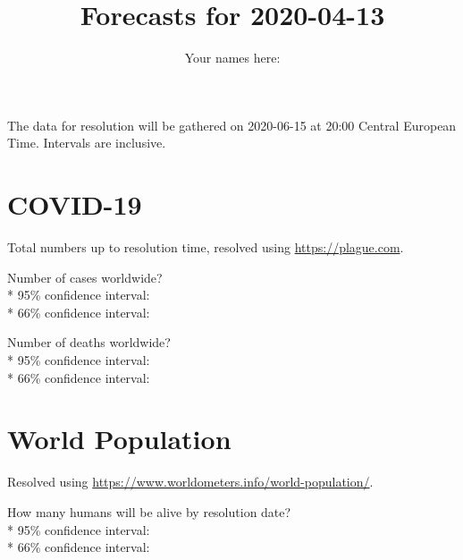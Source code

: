\documentclass{article}
\title{Forecasts for 2020-04-13}
\begin{document}
\date{\vspace{-7ex}}

\author{Your names here: \underline{\hspace{10cm}}}

\maketitle

\vspace{0.5cm}

The data for resolution will be gathered on 2020-06-15 at 20:00 Central
European Time. Intervals are inclusive.

\section*{COVID-19}

Total numbers up to resolution time, resolved using
\href{https://plague.com/}{https://plague.com}.

Number of cases worldwide?\\*
95\% confidence interval: \null\hfill\underline{\hspace{8cm}}\\*
66\% confidence interval: \null\hfill\underline{\hspace{8cm}}

\vspace{0.3cm}

Number of deaths worldwide?\\*
95\% confidence interval: \null\hfill\underline{\hspace{8cm}}\\*
66\% confidence interval: \null\hfill\underline{\hspace{8cm}}

\section*{World Population}

Resolved using
\href{https://www.worldometers.info/world-population/}{https://www.worldometers.info/world-population/}.

\vspace{0.3cm}

How many humans will be alive by resolution date?\\*
95\% confidence interval: \null\hfill\underline{\hspace{8cm}}\\*
66\% confidence interval: \null\hfill\underline{\hspace{8cm}}
\end{document}
